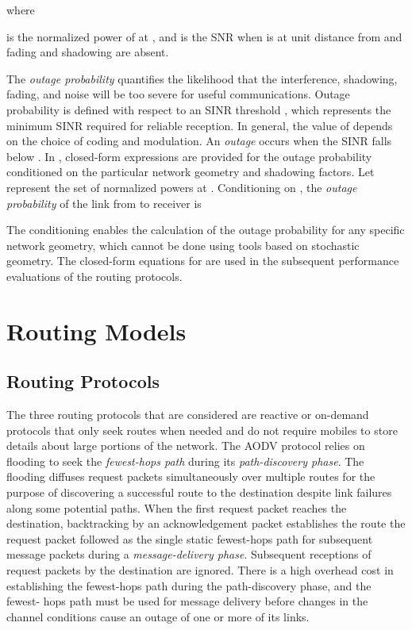 \documentclass[conference]{IEEEtran}
\begin{document}
where

is the normalized power of  at , and  is the SNR when  is at unit distance from 
and fading and shadowing are absent.

The \emph{outage probability} quantifies the likelihood that the interference,
shadowing, fading, and noise will be too severe for useful communications.
Outage probability is defined with respect to an SINR threshold , which
represents the minimum SINR required for reliable reception. In general, the
value of  depends on the choice of coding and modulation. An
\emph{outage} occurs when the SINR falls below . In \cite{tor},
closed-form expressions are provided for the outage probability conditioned on
the particular network geometry and shadowing factors. Let  represent the set of normalized
powers at . Conditioning on , the \emph{outage
probability} of the link from  to receiver  is

The conditioning enables the calculation of the outage probability for any
specific network geometry, which cannot be done using tools based on
stochastic geometry. The closed-form equations for  are used
in the subsequent performance evaluations of the routing protocols.

\section{Routing Models}

\subsection{Routing Protocols}

The three routing protocols that are considered are
reactive or on-demand protocols that only seek routes
when needed and do not require mobiles to store details about large portions of the network. The AODV protocol relies on flooding to seek the
\emph{fewest-hops path} during its
\emph{path-discovery phase}. The flooding diffuses
request packets simultaneously over multiple routes for
the purpose of discovering a successful route to the destination despite link failures along some potential paths.
When the first request packet reaches the destination,
backtracking by an acknowledgement packet establishes
the route the request packet followed as the single
static fewest-hops path for subsequent message packets
during a \emph{message-delivery phase}. Subsequent receptions
of request packets by the destination are ignored. There
is a high overhead cost in establishing the fewest-hops
path during the path-discovery phase, and the fewest-
hops path must be used for message delivery before
changes in the channel conditions cause an outage of
one or more of its links.
\end{document}
